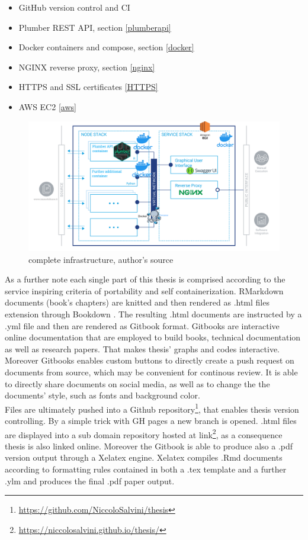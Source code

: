 \documentclass[
  12pt,
  a4paper,
  oneside]{book}
\DeclareRobustCommand{\href}[2]{#2\footnote{\url{#1}}}
\providecommand{\tightlist}{%
  \setlength{\itemsep}{0pt}\setlength{\parskip}{0pt}}
\theoremstyle{definition}
\theoremstyle{definition}
\theoremstyle{definition}
\theoremstyle{remark}
\begin{document}
\begin{itemize}
\tightlist
\item
  GitHub version control and CI
\item
  Plumber REST API, section \ref{plumberapi}
\item
  Docker containers and compose, section \ref{docker}
\item
  NGINX reverse proxy, section \ref{nginx}
\item
  HTTPS and SSL certificates \ref{HTTPS}
\item
  AWS EC2 \ref{aws}
\end{itemize}

\begin{figure}
\centering
\includegraphics{images/software_arch.jpg.png}
\caption{\label{fig:CompleteStructure}complete infrastructure, author's source}
\end{figure}

As a further note each single part of this thesis is comprised according to the service inspiring criteria of portability and self containerization. RMarkdown \citep{rmarkdown1} documents (book's chapters) are knitted and then rendered as .html files extension through Bookdown \citep{bookdown2}. The resulting .html documents are instructed by a .yml file and then are rendered as Gitbook format. Gitbooks are interactive online documentation that are employed to build books, technical documentation as well as research papers. That makes thesis' graphs and codes interactive. Moreover Gitbooks enables custom buttons to directly create a push request on documents from source, which may be convenient for continous review. It is able to directly share documents on social media, as well as to change the the documents' style, such as fonts and background color.\\
Files are ultimately pushed into a \href{https://github.com/NiccoloSalvini/thesis}{Github repository}, that enables thesis version controlling. By a simple trick with GH pages a new branch is opened. .html files are displayed into a sub domain repository hosted at \href{https://niccolosalvini.github.io/thesis/}{link}, as a consequence thesis is also linked online. Moreover the Gitbook is able to produce also a .pdf version output through a Xelatex engine. Xelatex compiles .Rmd documents according to formatting rules contained in both a .tex template and a further .ylm and produces the final .pdf paper output.
\end{document}
